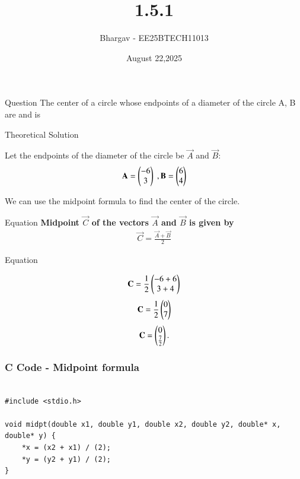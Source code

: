 \documentclass{beamer}
\title %
{1.5.1}
\date{August 22,2025}
\author %
{Bhargav - EE25BTECH11013}
\begin{document}
\frame{\titlepage}
\begin{frame}{Question}
The center of a circle whose endpoints of a diameter of the circle A, B are  and  is\\
\end{frame}



\begin{frame}{Theoretical Solution}

Let the endpoints of the diameter of the circle be $\vec{A}$ and $\vec{B}$:
\begin{align}
    \vec{A}=\begin{myvec}{-6\\3}\end{myvec} \;, \vec{B}=\begin{myvec}{6\\4} \end{myvec}
\end{align}

We can use the midpoint formula to find the center of the circle.\\

\end{frame}

\begin{frame}{Equation}
\textbf{Midpoint $\vec{C}$ of the vectors $\vec{A}$ and $\vec{B}$ is given by}
\begin{align}
    \vec{C}=\frac{\vec{A}+\vec{B}}{2} 
\end{align}
\end{frame}
\begin{frame}{Equation}

\begin{align}
    \vec{C}=\frac{1}{2}\myvec{-6+6 \\ 3+4} 
\end{align}
\begin{align}
    \vec{C}=\frac{1}{2} \myvec{0 \\ 7} 
\end{align}
\begin{align}
    \vec{C}=\myvec{0\\\tfrac{7}{2}}.
\end{align}
\end{frame}

\begin{frame}[fragile]
    \frametitle{C Code - Midpoint formula}

    \begin{lstlisting}

#include <stdio.h>

void midpt(double x1, double y1, double x2, double y2, double* x, double* y) {
    *x = (x2 + x1) / (2);
    *y = (y2 + y1) / (2);
}

    \end{lstlisting}
\end{frame}
\end{document}
